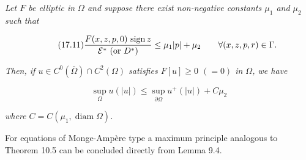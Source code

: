 \begin{theorem}[Theorem 17.3]\label{gt-ch17-thm-17-3}
\textit{Let $F$ be elliptic in $\Omega$ and suppose there exist non-negative constants $\mu_1$ and $\mu_2$ such that}

\begin{equation}\tag{17.11}
\frac{F(x, z, p, 0)\,\operatorname{sign} z}{\mathcal{E}^* \text{ (or } D^*\text{)}} \leq \mu_1 |p| + \mu_2
\qquad \forall (x, z, p, r) \in \Gamma.
\end{equation}

\noindent\textit{Then, if $u \in C^0(\bar{\Omega}) \cap C^2(\Omega)$ satisfies $F[u] \geq 0$ $(=0)$ in $\Omega$, we have}

\begin{equation}\tag{17.12}
\sup_{\Omega} u(|u|) \leq \sup_{\partial\Omega} u^+(|u|) + C\mu_2
\end{equation}

\noindent\textit{where $C = C(\mu_1, \operatorname{diam}\Omega)$.}
\end{theorem}

\medskip

For equations of Monge-Amp\`ere type a maximum principle analogous to Theorem 10.5 can be concluded directly from Lemma 9.4.

\medskip

